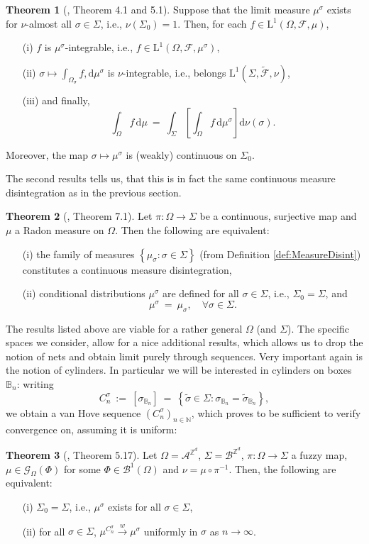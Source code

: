 \documentclass[12pt]{article}
\newcommand{\A}{\mathcal{A}}
\newcommand{\B}{\mathcal{B}}
\newcommand{\BB}{\mathscr{B}}
\newcommand{\BBB}{\mathbb{B}}
\renewcommand{\d}{\mathrm{d}}
\newcommand{\F}{\mathcal{F}}
\newcommand{\G}{\mathcal{G}}
\newcommand{\N}{\mathbb{N}}
\newcommand{\Z}{\mathbb{Z}}
\newcommand{\set}[1]{\left\{#1\right\}}
\newcommand{\oglati}[1]{\left[#1\right]}
\newcommand{\ra}{\rightarrow}
\newcommand{\1}{\mathbbm{1}}
\newcommand{\5}{\vspace{0.5cm}}
\renewcommand{\tilde}{\widetilde}
\theoremstyle{definition}
\newtheorem{thm}{Theorem}[section]
\begin{document}
\begin{thm}[\cite{Tju}, Theorem 4.1 and 5.1]
Suppose that the limit measure $\mu^\sigma$ exists for $\nu$-almost all $\sigma\in\Sigma$, i.e., $\nu(\Sigma_0)=1$. Then, for each $f\in\mathrm{L}^1(\Omega,\F,\mu)$,
\begin{itemize}
	\item[(i)] $f$ is $\mu^\sigma$-integrable, i.e., $f\in\mathrm{L}^1(\Omega,\F,\mu^\sigma)$, 
	\item[(ii)] $\sigma\mapsto\int_{\Omega_\sigma}f,\d\mu^\sigma$ is $\nu$-integrable, i.e., belongs $\mathrm{L}^1(\Sigma,\tilde{\F},\nu)$, 
	\item[(iii)] and finally,
	$$\int_\Omega f\,\d\mu ~=~ \int_\Sigma\!\oglati{\int_\Omega f\,\d\mu^\sigma}\!\d\nu(\sigma).$$
\end{itemize}
Moreover, the map $\sigma\mapsto\mu^\sigma$ is (weakly) continuous on $\Sigma_0$.
\end{thm}
The second results tells us, that this is in fact the same continuous measure disintegration as in the previous section.
\begin{thm}[\cite{Tju}, Theorem 7.1]
Let $\pi:\Omega\ra\Sigma$ be a continuous, surjective map and $\mu$ a Radon measure on $\Omega$. Then the following are equivalent:
\begin{itemize}
	\item[(i)] the family of measures $\set{\mu_\sigma:\sigma\in\Sigma}$ (from Definition \ref{def:MeasureDisint}) constitutes a continuous measure disintegration,
	\item[(ii)] conditional distributions $\mu^\sigma$ are defined for all $\sigma\in\Sigma$, i.e., $\Sigma_0=\Sigma$, and
	$$\mu^\sigma ~=~ \mu_\sigma, \quad \forall \sigma\in\Sigma.$$
\end{itemize}
\end{thm}

The results listed above are viable for a rather general $\Omega$ (and $\Sigma$). The specific spaces we consider, allow for a nice additional results, which allows us to drop the notion of nets and obtain limit purely through sequences. Very important again is the notion of cylinders. In particular we will be interested in cylinders on boxes $\BBB_n$: writing
$$C_n^\sigma ~:=~ [\sigma_{\BBB_n}] ~=~ \set{\tilde{\sigma}\in\Sigma:\sigma_{\BBB_n}=\tilde{\sigma}_{\BBB_n}},$$
we obtain a van Hove sequence $(C_n^\sigma)_{n\in\N}$, which proves to be sufficient to verify convergence on, assuming it is uniform:
\begin{thm}[\cite{Ber}, Theorem 5.17]
Let $\Omega=\A^{\Z^d}$, $\Sigma=\B^{\Z^d}$, $\pi:\Omega\ra\Sigma$ a fuzzy map, $\mu\in\G_\Omega(\Phi)$ for some $\Phi\in\BB^1(\Omega)$ and $\nu=\mu\circ\pi^{-1}$. Then, the following are equivalent:
\begin{itemize}
	\item[(i)] $\Sigma_0=\Sigma$, i.e., $\mu^\sigma$ exists for all $\sigma\in\Sigma$,
	\item[(ii)] for all $\sigma\in\Sigma$, $\mu^{C_n^\sigma}\xrightarrow{w}\mu^\sigma$ uniformly in $\sigma$ as $n\ra\infty$.
\end{itemize}
\end{thm}
\end{document}
